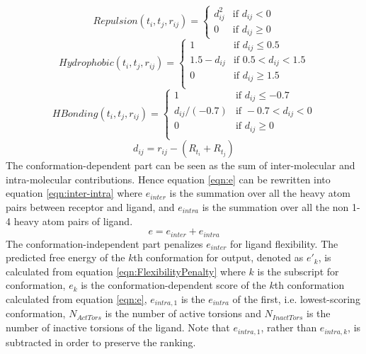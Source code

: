 \begin{equation}
\label{eqn:Repulsion}
Repulsion(t_i, t_j, r_{ij}) =
\begin{cases}
d_{ij}^2 & \text{if } d_{ij} < 0\\
0 &\text{if } d_{ij} \geq 0
\end{cases}
\end{equation}
\begin{equation}
\label{eqn:Hydrophobic}
Hydrophobic(t_i, t_j, r_{ij}) =
\begin{cases}
1 & \text{if } d_{ij} \leq 0.5\\
1.5 - d_{ij} & \text{if } 0.5 < d_{ij} < 1.5\\
0 & \text{if } d_{ij} \geq 1.5\\
\end{cases}
\end{equation}
\begin{equation}
\label{eqn:HBonding}
HBonding(t_i, t_j, r_{ij}) =
\begin{cases}
1 & \text{if } d_{ij} \leq -0.7\\
d_{ij} / (-0.7) & \text{if } -0.7 < d_{ij} < 0\\
0 & \text{if } d_{ij} \geq 0\\
\end{cases}
\end{equation}
\begin{equation}
\label{eqn:dij}
d_{ij} = r_{ij} - (R_{t_i} + R_{t_j})
\end{equation}
The conformation-dependent part can be seen as the sum of inter-molecular and intra-molecular contributions. Hence equation \eqref{eqn:e} can be rewritten into equation \eqref{eqn:inter-intra} where $e_{inter}$ is the summation over all the heavy atom pairs between receptor and ligand, and $e_{intra}$ is the summation over all the non 1-4 heavy atom pairs of ligand.
\begin{equation}
\label{eqn:inter-intra}
e = e_{inter} + e_{intra}
\end{equation}
The conformation-independent part penalizes $e_{inter}$ for ligand flexibility. The predicted free energy of the $k$th conformation for output, denoted as $e'_k$, is calculated from equation \eqref{eqn:FlexibilityPenalty} where $k$ is the subscript for conformation, $e_k$ is the conformation-dependent score of the $k$th conformation calculated from equation \eqref{eqn:e}, $e_{intra,1}$ is the $e_{intra}$ of the first, i.e. lowest-scoring conformation, $N_{ActTors}$ is the number of active torsions and $N_{InactTors}$ is the number of inactive torsions of the ligand. Note that $e_{intra,1}$, rather than $e_{intra,k}$, is subtracted in order to preserve the ranking.
